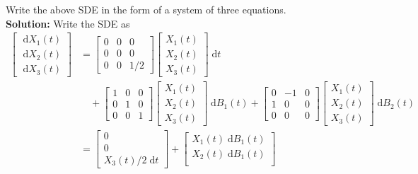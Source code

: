 \documentclass{MFM-hw} %
\newcommand{\dd}{\;\mathrm{d}}
\begin{document}
\HWsubproblem
 Write the above SDE in the form of a system of three equations.\\

 \textbf{Solution: }Write the SDE as
 \begin{align*}
     \begin{bmatrix}
        \dd X_1(t) \\
        \dd X_2(t) \\
        \dd X_3(t)
    \end{bmatrix}
    &= 
    \begin{bmatrix}
        0 & 0 & 0 \\
        0 & 0 & 0 \\
        0 & 0 & 1/2
    \end{bmatrix}
    \begin{bmatrix}
        X_1(t) \\
        X_2(t) \\
        X_3(t)
    \end{bmatrix} \dd t \\
    &\quad +
    \begin{bmatrix}
        1 & 0 & 0 \\
        0 & 1 & 0 \\
        0 & 0 & 1
    \end{bmatrix}
    \begin{bmatrix}
        X_1(t) \\
        X_2(t) \\
        X_3(t)
    \end{bmatrix} \dd B_1(t)
    +
    \begin{bmatrix}
        0 & -1 & 0 \\
        1 & 0 & 0 \\
        0 & 0 & 0
    \end{bmatrix}
    \begin{bmatrix}
        X_1(t) \\
        X_2(t) \\
        X_3(t)
    \end{bmatrix} \dd B_2(t) \\
    &=
    \begin{bmatrix}
        0 \\
        0 \\
         X_3(t)/2 \dd t
    \end{bmatrix}
    +
    \begin{bmatrix}
        X_1(t) \dd B_1(t)\\
        X_2(t) \dd B_1(t)\\

\end{bmatrix}
\end{align*}
\end{document}
